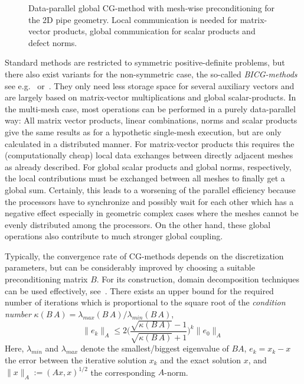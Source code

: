 \begin{figure}[ht]
\begin{center}

\caption{Data-parallel global CG-method with mesh-wise preconditioning for the 2D pipe geometry. Local communication is needed for matrix-vector products, global communication for scalar products and defect norms.} 
\label{FIG_SCARC_cg_method}
\end{center}
\end{figure}

Standard methods are restricted to symmetric positive-definite problems, but
there also exist variants for the non-symmetric case, the so-called {\it BICG-methods} see e.g.~\cite{Saad:2003} or~\cite{Axelsson:1998}.
%
They only need less storage space for several auxiliary vectors and are largely based on matrix-vector multiplications and global scalar-products.
In the multi-mesh case, most operations can be performed in a purely data-parallel way: All matrix vector products, linear combinations, norms and scalar products give the same results as for a hypothetic single-mesh execution, but are only calculated in a distributed manner. For matrix-vector products this requires the (computationally cheap) local data exchanges between directly adjacent meshes as already described. For global scalar products %
and global norms, respectively, the local contributions must be exchanged between all meshes to finally get a global sum. Certainly, this leads to a worsening of the parallel efficiency because the processors have to synchronize and possibly wait for each other which has a negative effect especially in geometric complex cases where the meshes cannot be evenly distributed among the processors. On the other hand, these global operations also contribute to much stronger global coupling.

Typically, the convergence rate of CG-methods  depends on the discretization parameters, but can be considerably improved by choosing a suitable preconditioning matrix $B$. For its construction, domain decomposition techniques can be used effectively, see~\cite{Bramble:1991}.
There exists an upper bound for the required number of iterations which is
proportional to the square root of the {\it condition number} $\kappa (B \, A) = \lambda_{max} (B \, A) / \lambda_{min} (B\, A)$,
\[ \| e_k \|_A \leq 2 \big(\frac{\sqrt{\kappa (B \,A)} -1}{\sqrt{\kappa (B \,A)} +1}\big)^k \| e_0\|_A\,\]  
Here, $\lambda_{min}$ and $\lambda_{max}$ denote the smallest/biggest eigenvalue of $B A$, $e_k= x_k - x$ the error between the iterative solution $x_k$ and the exact solution $x$, and  $\|x\|_A := (Ax,x) ^{1/2}$ the corresponding $A$-norm.

